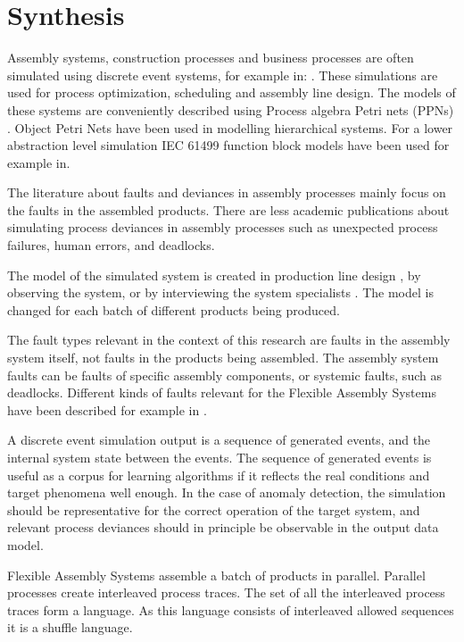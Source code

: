 \documentclass[a4paper,10pt]{article}
\begin{document}
\section{Synthesis}

Assembly systems, construction processes and business processes are often simulated using discrete event systems, for example in:
\cite{hlupic1998business,zhao2010efficient,kang2013active,rahnama2010fuzzy}. These simulations are used for process optimization\cite{sadeghi2008framework}, scheduling and
assembly line design. The models of these systems are conveniently described using Process algebra Petri nets (PPNs) \cite{falkman2007specification}. Object Petri Nets
have been used in modelling hierarchical systems\cite{wu2015method}. For a lower abstraction level simulation IEC 61499 function block models\cite{tc652004wg6} have been used
for example in\cite{rooker2008modeling}.

The literature about faults and deviances in assembly processes mainly focus on the faults in the assembled products.
There are less academic publications about simulating process deviances in assembly processes such as unexpected process failures, human errors, and deadlocks.

The model of the simulated system is created in production line design \cite{bullinger}, by observing the system, or by interviewing the system specialists \cite{montevechi2012using}.
The model is changed for each batch of different products being produced.

The fault types relevant in the context of this research are faults in the assembly system itself, not faults in the products being assembled.
The assembly system faults can be faults of specific assembly components, or systemic faults, such as deadlocks.
Different kinds of faults relevant for the Flexible Assembly Systems have been described for example in \cite{cong1997fault}.

A discrete event simulation output is a sequence of generated events,
and the internal system state between the events. The sequence of generated events is useful as a corpus for learning algorithms if it reflects the real conditions and
target phenomena well enough. In the case of anomaly detection, the simulation should be representative for the correct operation of the target system, and relevant process deviances
should in principle be observable in the output data model.

Flexible Assembly Systems assemble a batch of products in parallel.
Parallel processes create interleaved process traces. The set of all the interleaved process traces form a language. As this language consists of interleaved allowed sequences
it is a shuffle language\cite{berglund2011recognizing}.
\end{document}
